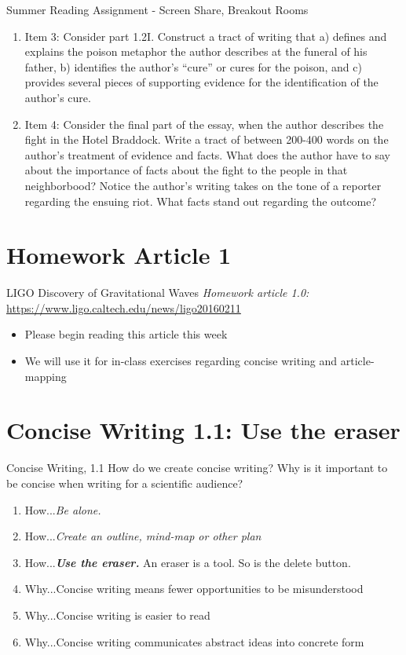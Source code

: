 \documentclass{beamer}
\begin{document}
\begin{frame}{Summer Reading Assignment - Screen Share, Breakout Rooms}
\small
\begin{enumerate}
\item Item 3: Consider part 1.2I. Construct a tract of writing that a) defines and explains the poison metaphor the
author describes at the funeral of his father, b) identifies the author’s “cure” or cures for the poison, and c)
provides several pieces of supporting evidence for the identification of the author’s cure.
\item Item 4: Consider the final part of the essay, when the author describes the fight in the Hotel Braddock. Write
a tract of between 200-400 words on the author’s treatment of evidence and facts. What does the author have
to say about the importance of facts about the fight to the people in that neighborbood? Notice the author’s
writing takes on the tone of a reporter regarding the ensuing riot. What facts stand out regarding the outcome?
\end{enumerate}
\end{frame}

\section{Homework Article 1}

\begin{frame}{LIGO Discovery of Gravitational Waves}
\textit{Homework article 1.0:} \\
\url{https://www.ligo.caltech.edu/news/ligo20160211} \\
\begin{itemize}
\item Please begin reading this article this week
\item We will use it for in-class exercises regarding concise writing and article-mapping
\end{itemize}
\end{frame}

\section{Concise Writing 1.1: Use the eraser}

\begin{frame}{Concise Writing, 1.1}
How do we create concise writing?  Why is it important to be concise when writing for a scientific audience?
\begin{enumerate}
\item How...\textit{Be alone.}
\item How...\textit{Create an outline, mind-map or other plan}
\item How...\textit{\textbf{Use the eraser.}}  An eraser is a tool.  So is the delete button.
\item Why...Concise writing means fewer opportunities to be misunderstood
\item Why...Concise writing is easier to read
\item Why...Concise writing communicates abstract ideas into concrete form
\end{enumerate}
\end{frame}
\end{document}
